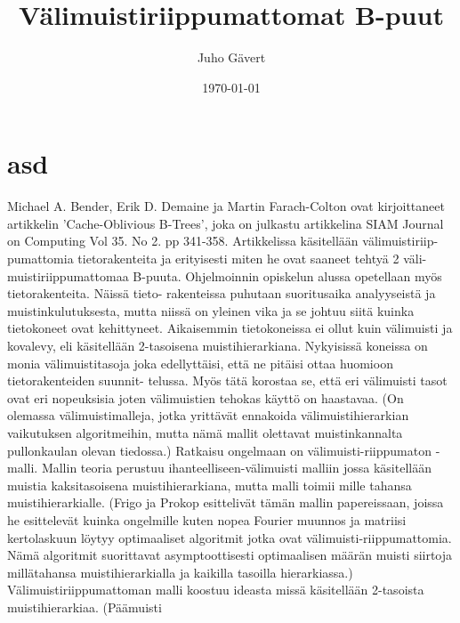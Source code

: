 \documentclass[finnish]{tktltiki2}
\title{Välimuistiriippumattomat B-puut}
\author{Juho Gävert}
\date{\today}
\theoremstyle{definition}
\theoremstyle{remark}
\begin{document}

\maketitle        %
\makeabstract     %

\newpage          %



\section{asd}


Michael A. Bender, Erik D. Demaine ja Martin Farach-Colton ovat kirjoittaneet
artikkelin 'Cache-Oblivious B-Trees', joka on julkastu artikkelina SIAM Journal
on Computing Vol 35. No 2. pp 341-358. Artikkelissa käsitellään välimuistiriip-
pumattomia tietorakenteita ja erityisesti miten he ovat saaneet tehtyä 2 väli-
muistiriippumattomaa B-puuta.
  Ohjelmoinnin opiskelun alussa opetellaan myös tietorakenteita. Näissä tieto-
rakenteissa puhutaan suoritusaika analyyseistä ja muistinkulutuksesta, mutta
niissä on yleinen vika ja se johtuu siitä kuinka tietokoneet ovat kehittyneet.
Aikaisemmin tietokoneissa ei ollut kuin välimuisti ja kovalevy, eli käsitellään
2-tasoisena muistihierarkiana. Nykyisissä koneissa on monia välimuistitasoja
joka edellyttäisi, että ne pitäisi ottaa huomioon tietorakenteiden suunnit-
telussa. Myös tätä korostaa se, että eri välimuisti tasot ovat eri nopeuksisia
joten välimuistien tehokas käyttö on haastavaa. (On olemassa välimuistimalleja,
jotka yrittävät ennakoida välimuistihierarkian vaikutuksen algoritmeihin, mutta
nämä mallit olettavat muistinkannalta pullonkaulan olevan tiedossa.)
  Ratkaisu ongelmaan on välimuisti-riippumaton -malli. Mallin teoria perustuu
ihanteelliseen-välimuisti malliin jossa käsitellään muistia kaksitasoisena
muistihierarkiana, mutta malli toimii mille tahansa muistihierarkialle. (Frigo
ja Prokop esittelivät tämän mallin papereissaan, joissa he esittelevät kuinka
ongelmille kuten nopea Fourier muunnos ja matriisi kertolaskuun löytyy
optimaaliset algoritmit jotka ovat välimuisti-riippumattomia. Nämä algoritmit
suorittavat asymptoottisesti optimaalisen määrän muisti siirtoja millätahansa
muistihierarkialla ja kaikilla tasoilla hierarkiassa.) Välimuistiriippumattoman
malli koostuu ideasta missä käsitellään 2-tasoista muistihierarkiaa. (Päämuisti
\end{document}
